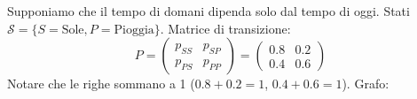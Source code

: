 \begin{example}
Supponiamo che il tempo di domani dipenda solo dal tempo di oggi. Stati $\mathcal{S} = \{S=\text{Sole}, P=\text{Pioggia}\}$.
Matrice di transizione:
\begin{equation*}
P = \begin{pmatrix}
p_{SS} & p_{SP} \\
p_{PS} & p_{PP}
\end{pmatrix} =
\begin{pmatrix}
0.8 & 0.2 \\ %
0.4 & 0.6  %
\end{pmatrix}
\end{equation*}
Notare che le righe sommano a 1 ($0.8+0.2=1$, $0.4+0.6=1$).
Grafo:
\begin{center}
\end{center}
\end{example}

